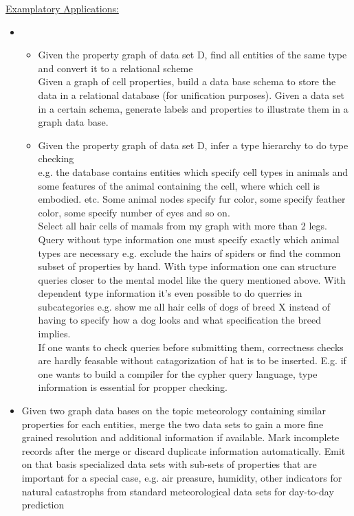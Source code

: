 \underline{Examplatory Applications: } \\
\begin{itemize}
    \item 
    \begin{itemize}
        \item Given the property graph of data set D, find all entities of the same type and convert it to a relational scheme \\
        Given a graph of cell properties, build a data base schema to store the data in a relational database (for unification purposes). Given a data set in a certain schema, generate labels and properties to illustrate them in a graph data base.
        \item Given the property graph of data set D, infer a type hierarchy to do type checking \\
        e.g. the database contains entities which specify cell types in animals and some features of the animal containing the cell, where which cell is embodied. etc. Some animal nodes specify fur color, some specify feather color, some specify number of eyes and so on. \\
        Select all hair cells of mamals from my graph with more than 2 legs. \\
        Query without type information one must specify exactly which animal types are necessary e.g. exclude the hairs of spiders or find the common subset of properties by hand.
        With type information one can structure queries closer to the mental model like the query mentioned above. With dependent type information it's even possible to do querries in subcategories e.g. show me all hair cells of dogs of breed X instead of having to specify how a dog looks and what specification the breed implies. \\
        If one wants to check queries before submitting them, correctness checks are hardly feasable without catagorization of hat is to be inserted. E.g. if one wants to build a compiler for the cypher query language, type information is essential for propper checking.
    \end{itemize} 
    \item Given two graph data bases on the topic meteorology containing similar properties for each entities, merge the two data sets to gain a more fine grained resolution and additional information if available. Mark incomplete records after the merge or discard duplicate information automatically. Emit on that basis specialized data sets with sub-sets of properties that are important for a special case, e.g. air preasure, humidity, other indicators for natural catastrophs from standard meteorological data sets for day-to-day prediction
    

\end{itemize}
